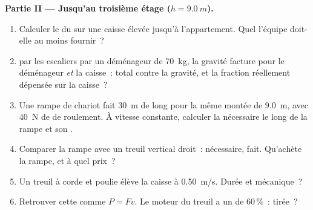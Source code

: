 \begin{problem}
\medskip
\noindent\textbf{Partie II --- Jusqu'au troisième étage ($h = \qty{9.0}{m}$).}
\begin{enumerate}[resume]
  \item Calculer le  du
         sur une caisse
        élevée jusqu'à l'appartement. Quel
         l'équipe doit-elle au moins
        fournir~?
  \item {} par les escaliers par un déménageur de \qty{70}{kg}, la
        gravité facture pour le déménageur \emph{et} la caisse~:
         total contre la gravité, et
        la fraction réellement dépensée sur la caisse~?
  \item Une rampe de chariot fait \qty{30}{m} de long pour la même
        montée de \qty{9.0}{m}, avec \qty{40}{N} de
         de roulement. À vitesse
        constante, calculer la  nécessaire le long de la rampe et
        son .
  \item Comparer la rampe avec un treuil vertical droit~:
         nécessaire,
         fait. Qu'achète la
        rampe, et à quel prix~?
  \item Un treuil à corde et poulie élève la caisse à \qty{0.50}{m/s}.
        Durée et  mécanique~?
  \item Retrouver cette  comme
        $P = Fv$. Le moteur du treuil a un
         de $60\,\%$~:
         tirée~?
\end{enumerate}


\end{problem}
